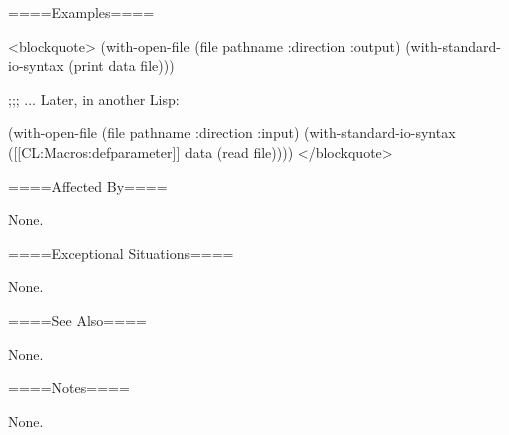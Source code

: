====Examples====

<blockquote> (with-open-file (file pathname :direction :output) (with-standard-io-syntax (print data file)))

;;; ... Later, in another Lisp:

(with-open-file (file pathname :direction :input) (with-standard-io-syntax ([[CL:Macros:defparameter]] data (read file)))) </blockquote>

====Affected By====

None.

====Exceptional Situations====

None.

====See Also====

None.

====Notes====

None.

